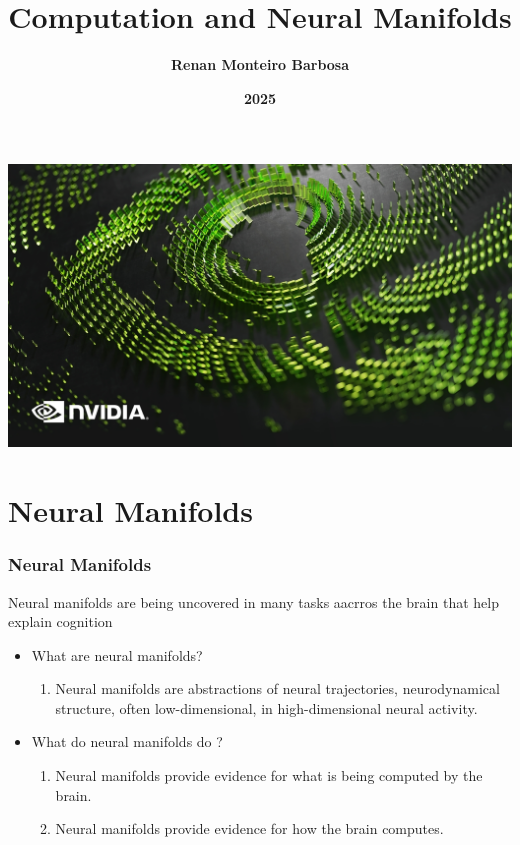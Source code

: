 \documentclass{beamer}
\begin{document}
{
{
    \includegraphics[width=\paperwidth,height=\paperheight]{images/Screenshot_9-12-2024_212019_.jpeg}
}
\title{\textbf{Computation and Neural Manifolds}}
\author[]{\textbf{Renan Monteiro Barbosa}}
\date[]{\textbf{2025}}
\maketitle
}


\section{Neural Manifolds}
\begin{frame}
\frametitle{\textbf{Neural Manifolds}}

Neural manifolds are being uncovered in many tasks aacrros the brain that help explain cognition

\begin{itemize}
    \item What are neural manifolds?
    \begin{enumerate}
        \item Neural manifolds are abstractions of neural trajectories, neurodynamical structure, often low-dimensional, in high-dimensional neural activity.
    \end{enumerate}
    \item What do neural manifolds do ?
    \begin{enumerate}
        \item Neural manifolds provide evidence for what is being computed by the brain.
        \item Neural manifolds provide evidence for how the brain computes.
    \end{enumerate}
\end{itemize}


\end{frame}
\end{document}
